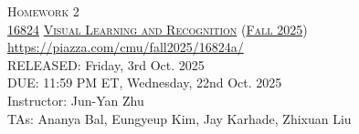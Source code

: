 \documentclass[11pt,addpoints,answers]{exam}
\title{\textsc{\hwName}} %
\author{}
\date{}
\date{}
\numberwithin{equation}{section} %
\numberwithin{figure}{section} %
\numberwithin{table}{section} %
\newcommand{\courseNum}{\href{https://visual-learning.cs.cmu.edu/}{16824}}
\newcommand{\courseName}{\href{https://visual-learning.cs.cmu.edu/}{Visual Learning and Recognition}}
\newcommand{\courseSem}{\href{https://visual-learning.cs.cmu.edu/}{Fall 2025}}
\newcommand{\courseUrl}{\url{https://piazza.com/cmu/fall2025/16824a/}}
\newcommand{\hwNum}{Homework 2}
\newcommand{\hwTopic}{Generative Modelling}
\newcommand{\outDate}{Friday, 3rd Oct. 2025}
\newcommand{\dueDate}{11:59 PM ET, Wednesday, 22nd Oct. 2025}
\newcommand{\instructorName}{Jun-Yan Zhu}
\newcommand{\taNames}{Ananya Bal, Eungyeup Kim, Jay Karhade, Zhixuan Liu}
\begin{document}
\section*{}
\begin{center}
  \textsc{\LARGE \hwNum} \\
  \vspace{1em}
  \textsc{\large \courseNum{} \courseName{} (\courseSem)} \\
  \courseUrl\\
  \vspace{1em}
  RELEASED: \outDate \\
  DUE: \dueDate \\
  Instructor: \instructorName \\
  TAs: \taNames
\end{center}
\end{document}
